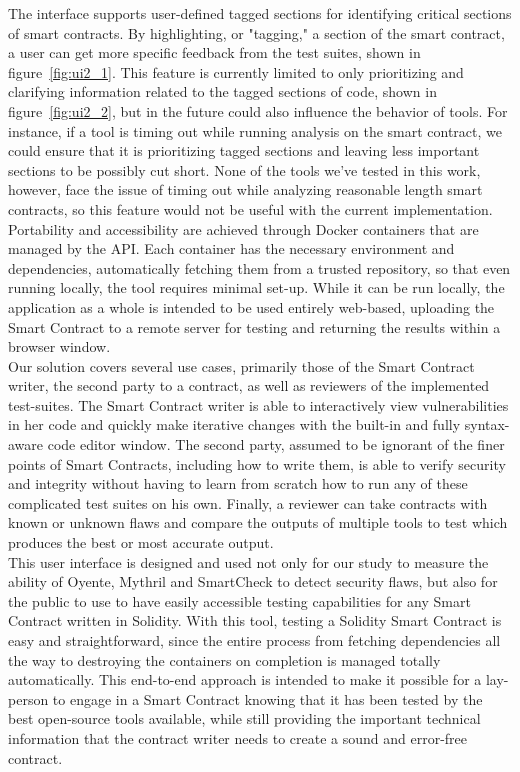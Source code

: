 The interface supports user-defined tagged sections for identifying critical sections of smart contracts. By highlighting, or "tagging," a section of the smart contract, a user can get more specific feedback from the test suites, shown in figure~\ref{fig:ui2_1}. This feature is currently limited to only prioritizing and clarifying information related to the tagged sections of code, shown in figure~\ref{fig:ui2_2}, but in the future could also influence the behavior of tools. For instance, if a tool is timing out while running analysis on the smart contract, we could ensure that it is prioritizing tagged sections and leaving less important sections to be possibly cut short. None of the tools we've tested in this work, however, face the issue of timing out while analyzing reasonable length smart contracts, so this feature would not be useful with the current implementation. \\

Portability and accessibility are achieved through Docker containers that are managed by the API. Each container has the necessary environment and dependencies, automatically fetching them from a trusted repository, so that even running locally, the tool requires minimal set-up. While it can be run locally, the application as a whole is intended to be used entirely web-based, uploading the Smart Contract to a remote server for testing and returning the results within a browser window. \\

Our solution covers several use cases, primarily those of the Smart Contract writer, the second party to a contract, as well as reviewers of the implemented test-suites. The Smart Contract writer is able to interactively view vulnerabilities in her code and quickly make iterative changes with the built-in and fully syntax-aware code editor window. The second party, assumed to be ignorant of the finer points of Smart Contracts, including how to write them, is able to verify security and integrity without having to learn from scratch how to run any of these complicated test suites on his own. Finally, a reviewer can take contracts with known or unknown flaws and compare the outputs of multiple tools to test which produces the best or most accurate output. \\

This user interface is designed and used not only for our study to measure the ability of Oyente, Mythril and SmartCheck to detect security flaws, but also for the public to use to have easily accessible testing capabilities for any Smart Contract written in Solidity. With this tool, testing a Solidity Smart Contract is easy and straightforward, since the entire process from fetching dependencies all the way to destroying the containers on completion is managed totally automatically. This end-to-end approach is intended to make it possible for a lay-person to engage in a Smart Contract knowing that it has been tested by the best open-source tools available, while still providing the important technical information that the contract writer needs to create a sound and error-free contract. \\

